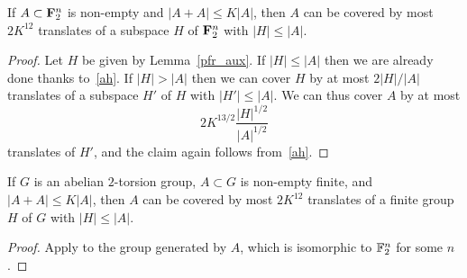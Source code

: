 \begin{theorem}[PFR]\label{pfr}
\leanok
If $A \subset {\bf F}_2^n$ is non-empty and $|A+A| \leq K|A|$, then $A$ can be covered by most $2K^{12}$ translates of a subspace $H$ of ${\bf F}_2^n$ with $|H| \leq |A|$.
\end{theorem}

\begin{proof}
  \leanok
  Let $H$ be given by Lemma~\ref{pfr_aux}.
  If $|H| \leq |A|$ then we are already done thanks to~\eqref{ah}.  If $|H| > |A|$ then we can cover $H$ by at most $2 |H|/|A|$ translates of a subspace $H'$ of $H$ with $|H'| \leq |A|$.  We can thus cover $A$ by at most
  \[2K^{13/2} \frac{|H|^{1/2}}{|A|^{1/2}}\]
  translates of $H'$, and the claim again follows from~\eqref{ah}.
\end{proof}

\begin{corollary}\label{pfr-cor}
  \leanok
  If $G$ is an abelian $2$-torsion group, $A \subset G$ is non-empty finite, and $|A+A| \leq K|A|
  $, then $A$ can be covered by most $2K^{12}$ translates of a finite group  $H$ of $G$ with $|H| \leq |A|$.
  \end{corollary}

\begin{proof}\leanok  Apply  to the group generated by $A$, which is isomorphic to $\mathbb{F}_2^n$ for some $n$.
\end{proof}
